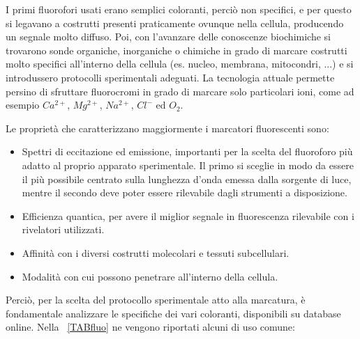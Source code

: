 I primi fluorofori usati erano semplici coloranti, perciò non specifici, e per questo si legavano a costrutti presenti praticamente ovunque nella cellula, producendo un segnale molto diffuso. 
Poi, con l'avanzare delle conoscenze biochimiche si trovarono sonde organiche, inorganiche o chimiche in grado di marcare costrutti molto specifici all'interno della cellula (es. nucleo, membrana, mitocondri, ...) e si introdussero protocolli sperimentali adeguati. 
La tecnologia attuale permette persino di sfruttare fluorocromi in grado di marcare solo particolari ioni, come ad esempio $Ca^{2+}$, $Mg^{2+}$, $Na^{2+}$, $Cl^-$ ed $O_2$.

Le proprietà che caratterizzano maggiormente i marcatori fluorescenti sono:

\begin{itemize}
\item Spettri di eccitazione ed emissione, importanti per la scelta del fluoroforo più adatto al proprio apparato sperimentale. 
Il primo si sceglie in modo da essere il più possibile centrato sulla lunghezza d'onda emessa dalla sorgente di luce, mentre il secondo deve poter essere rilevabile dagli strumenti a disposizione. 

\item Efficienza quantica, per avere il miglior segnale in fluorescenza rilevabile con i rivelatori utilizzati. 

\item Affinità con i diversi costrutti molecolari e tessuti subcellulari.

\item Modalità con cui possono penetrare all'interno della cellula.
\end{itemize}

Perciò, per la scelta del protocollo sperimentale atto alla marcatura, è fondamentale analizzare le specifiche dei vari coloranti, disponibili su database online. 
Nella \tablename~\ref{TABfluo} ne vengono riportati alcuni di uso comune:

